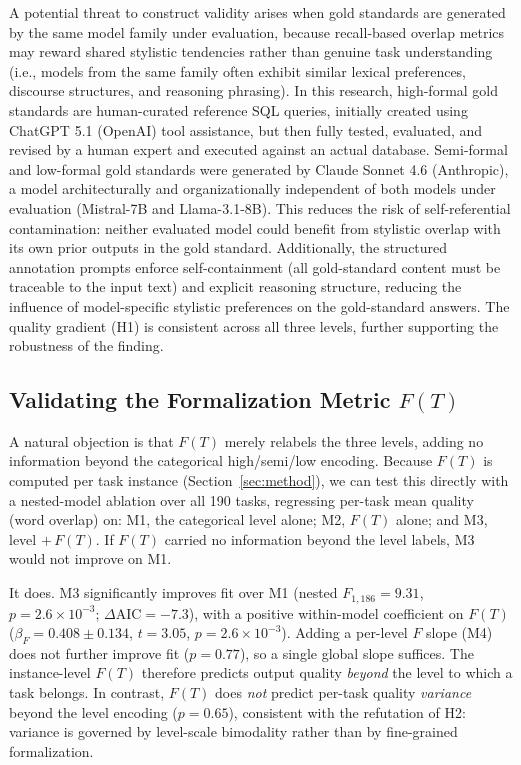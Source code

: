 \documentclass[runningheads]{llncs}
\begin{document}

A potential threat to construct validity arises when gold standards are generated by the same model family under evaluation, because recall-based overlap metrics may reward shared stylistic tendencies rather than genuine task understanding (i.e., models from the same family often exhibit similar lexical preferences, discourse structures, and reasoning phrasing). In this research, high-formal gold standards are human-curated reference SQL queries, initially created using ChatGPT 5.1 (OpenAI) tool assistance, but then fully tested, evaluated, and revised by a human expert and executed against an actual database. Semi-formal and low-formal gold standards were generated by Claude Sonnet 4.6 (Anthropic), a model architecturally and organizationally independent of both models under evaluation (Mistral-7B and Llama-3.1-8B). This reduces the risk of self-referential contamination: neither evaluated model could benefit from stylistic overlap with its own prior outputs in the gold standard. Additionally, the structured annotation prompts enforce self-containment (all gold-standard content must be traceable to the input text) and explicit reasoning structure, reducing the influence of model-specific stylistic preferences on the gold-standard answers. The quality gradient (H1) is consistent across all three levels, further supporting the robustness of the finding.

\subsection{Validating the Formalization Metric $F(T)$}
\label{sec:F-validation}

A natural objection is that $F(T)$ merely relabels the three levels, adding no information beyond the categorical high/semi/low encoding. Because $F(T)$ is computed per task instance (Section~\ref{sec:method}), we can test this directly with a nested-model ablation over all 190 tasks, regressing per-task mean quality (word overlap) on: M1, the categorical level alone; M2, $F(T)$ alone; and M3, level $+\,F(T)$. If $F(T)$ carried no information beyond the level labels, M3 would not improve on M1.

It does. M3 significantly improves fit over M1 (nested $F_{1,186}=9.31$, $p=2.6\times10^{-3}$; $\Delta\text{AIC}=-7.3$), with a positive within-model coefficient on $F(T)$ ($\beta_F=0.408 \pm 0.134$, $t=3.05$, $p=2.6\times10^{-3}$). Adding a per-level $F$ slope (M4) does not further improve fit ($p=0.77$), so a single global slope suffices. The instance-level $F(T)$ therefore predicts output quality \emph{beyond} the level to which a task belongs. In contrast, $F(T)$ does \emph{not} predict per-task quality \emph{variance} beyond the level encoding ($p=0.65$), consistent with the refutation of H2: variance is governed by level-scale bimodality rather than by fine-grained formalization.
\end{document}
